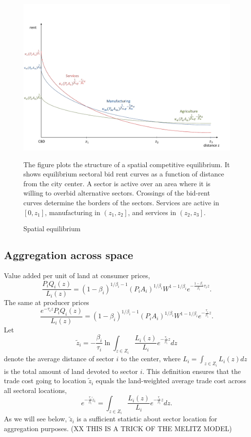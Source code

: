 \documentclass[12pt]{article}
\begin{document}
\begin{figure}[h!]
\label{fig:BidRent}
\caption{Spatial equilibrium}
\begin{center}
\includegraphics[scale=0.6]{figures/fig_spatial_equilibrium}
\end{center}

\noindent \footnotesize{The figure plots the structure of a spatial competitive equilibrium. It shows equilibrium sectoral bid rent curves as a function of distance from the city center. A sector is active over an area where it is willing to overbid alternative sectors. Crossings of the bid-rent curves determine the borders of the sectors. Services are active in $[0,z_1]$, manufacturing in $\left(z_1,z_2\right]$, and services in $\left(z_2,z_3\right]$.}
\end{figure}

\subsection{Aggregation across space}

Value added per unit of land at consumer prices,
\[
\frac{P_i Q_i(z)}{L_i(z)} = (1-\beta_i)^{1/\beta_i-1}
(P_iA_i)^{1/\beta_i}W^{1-1/\beta_i}
 e^{-\frac{1-\beta_i}{\beta_i}\tau_i z}.
\]
The same at producer prices
\[
\frac{e^{-\tau_i z} P_i Q_i(z)}{L_i(z)} = (1-\beta_i)^{1/\beta_i-1}
(P_iA_i)^{1/\beta_i}W^{1-1/\beta_i}
 e^{-\frac{\tau_i}{\beta_i} z}.
\]
Let
\[
\tilde z_i = -
\frac{\beta_i}{\tau_i}
\ln\int_{z\in Z_i} \frac{L_i(z)}{L_i}e^{-\frac{\tau_i}{\beta_i} z}dz
\]
denote the average distance of sector $i$ to the center, where $L_i=\int_{z\in Z_i} L_i(z)dz$ is the total amount of land devoted to sector $i$. This definition ensures that the trade cost going to location $\tilde z_i$ equals the land-weighted average trade cost across all sectoral locations,
\[
e^{-\frac{\tau_i}{\beta_i} \tilde z_i} = \int_{z\in Z_i} \frac{L_i(z)}{L_i}e^{-\frac{\tau_i}{\beta_i} z}dz.
\]
As we will see below, $\tilde z_i$ is a sufficient statistic about sector location for aggregation purposes. (XX THIS IS A TRICK OF THE MELITZ MODEL)
\end{document}

